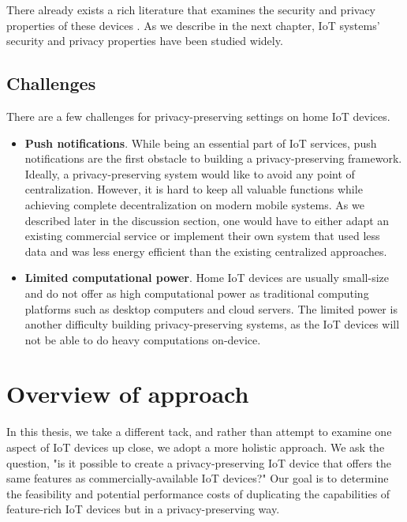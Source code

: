 There already exists a rich literature that examines the security and privacy properties of these devices \cite{acar2016sok} \cite{hilt2019internet} \cite{shumailov2019hearing} \cite{apthorpe2017smart}. As we describe in the next chapter, IoT systems' security and privacy properties have been studied widely.


\subsection{Challenges}

There are a few challenges for privacy-preserving settings on home IoT devices. 

\begin{itemize}
	\item \textbf{Push notifications}. While being an essential part of IoT services, push notifications are the first obstacle to building a privacy-preserving framework. Ideally, a privacy-preserving system would like to avoid any point of centralization. However, it is hard to keep all valuable functions while achieving complete decentralization on modern mobile systems. As we described later in the discussion section, one would have to either adapt an existing commercial service or implement their own system that used less data and was less energy efficient than the existing centralized approaches.
	\item \textbf{Limited computational power}. Home IoT devices are usually  small-size and do not offer as high computational power as traditional computing platforms such as desktop computers and cloud servers. The limited power is another difficulty building privacy-preserving systems, as the IoT devices will not be able to do heavy computations on-device.
\end{itemize}

\section{Overview of approach}

In this thesis, we take a different tack, and rather than attempt to examine one aspect of IoT devices up close, we adopt a more holistic approach. We ask the question, "is it possible to create a privacy-preserving IoT device that offers the same features as commercially-available IoT devices?" Our goal is to determine the feasibility and potential performance costs of duplicating the capabilities of feature-rich IoT devices but in a privacy-preserving way.

